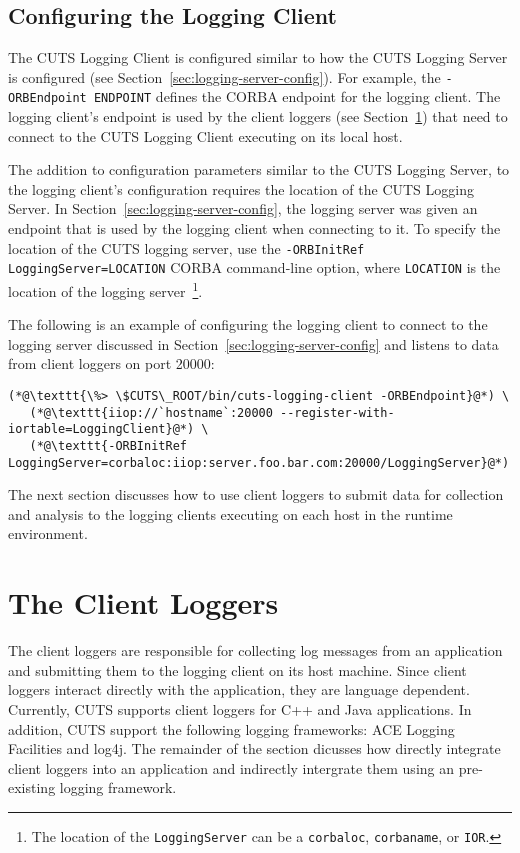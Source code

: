 \subsection{Configuring the Logging Client}

The CUTS Logging Client is configured similar to how the CUTS Logging
Server is configured (see Section~\ref{sec:logging-server-config}). For
example, the \texttt{-ORBEndpoint ENDPOINT} defines the CORBA endpoint
for the logging client. The logging client's endpoint is used by the 
client loggers (see Section~\ref{sec:client-loggers}) that need to 
connect to the CUTS Logging Client executing on its local host.

The addition to configuration parameters similar to the CUTS Logging 
Server, to the logging client's configuration requires the location 
of the CUTS Logging Server. In Section~\ref{sec:logging-server-config},
the logging server was given an endpoint that is used by the logging
client when connecting to it. To specify the location of the CUTS
logging server, use the \texttt{-ORBInitRef LoggingServer=LOCATION} 
CORBA command-line option, where \texttt{LOCATION} is the location
of the logging server~\footnote{The location of the \texttt{LoggingServer}
can be a \texttt{corbaloc}, \texttt{corbaname}, or \texttt{IOR}.}.

The following is an example of configuring the logging client to 
connect to the logging server discussed in 
Section~\ref{sec:logging-server-config} and listens to data from
client loggers on port 20000:
\begin{lstlisting}
(*@\texttt{\%> \$CUTS\_ROOT/bin/cuts-logging-client -ORBEndpoint}@*) \
   (*@\texttt{iiop://`hostname`:20000 --register-with-iortable=LoggingClient}@*) \
   (*@\texttt{-ORBInitRef LoggingServer=corbaloc:iiop:server.foo.bar.com:20000/LoggingServer}@*)
\end{lstlisting}
The next section discusses how to use client loggers to submit data
for collection and analysis to the logging clients executing on each
host in the runtime environment.

\section{The Client Loggers}
\label{sec:client-loggers}

The client loggers are responsible for collecting log messages from
an application and submitting them to the logging client on its host
machine. Since client loggers interact directly with the application,
they are language dependent. Currently, CUTS supports client loggers
for C++ and Java applications. In addition, CUTS support the following
logging frameworks: ACE Logging Facilities and log4j. The remainder
of the section dicusses how directly integrate client loggers into
an application and indirectly intergrate them using an pre-existing
logging framework.

